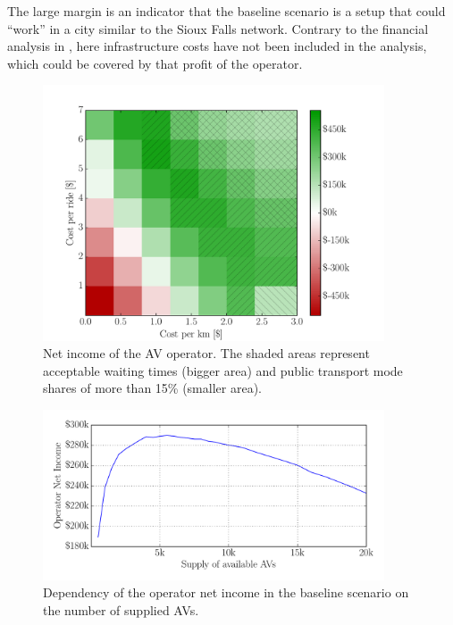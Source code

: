 The large margin is an indicator that the baseline scenario is a setup
that could ``work'' in a city similar to the Sioux Falls network. Contrary to
the financial analysis in , here infrastructure costs have not been
included in the analysis, which could be covered by that profit of the operator.

\begin{figure}
    \centering
    \includegraphics[width=0.9\textwidth]{figures/netincomegrid.pdf}
    \caption{Net income of the AV operator. The shaded areas represent acceptable
    waiting times (bigger area) and public transport mode shares of more than
    15\% (smaller area).}
    \label{fig:netincomegrid}
\end{figure}

\begin{figure}
    \centering
    \includegraphics[width=0.9\textwidth]{figures/revenuesupply.pdf}
    \caption{Dependency of the operator net income in the baseline scenario on
    the number of supplied AVs.}
    \label{fig:revenuesupply}
\end{figure}

